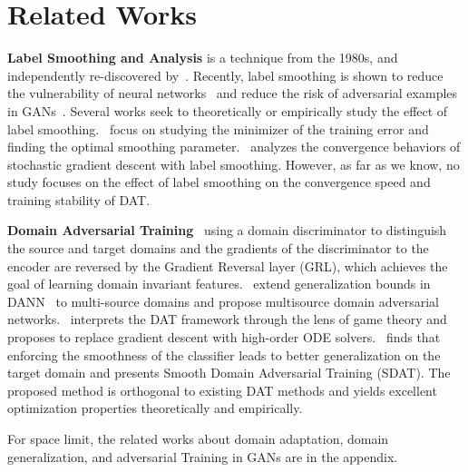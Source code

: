 \documentclass{article} \usepackage{iclr2023_conference,times}
\begin{document}
\section{Related Works}
\vspace{-0.2cm}





\noindent\textbf{Label Smoothing and Analysis} is a technique from the 1980s, and independently re-discovered by~\citep{szegedy2016rethinking}. Recently, label smoothing is shown to reduce the vulnerability of neural networks~\citep{warde201611} and reduce the risk of adversarial examples in GANs~\citep{salimans2016improved}. Several works seek to theoretically or empirically study the effect of label smoothing.~\citep{chen2020investigation} focus on studying the minimizer of the training error and finding the optimal smoothing parameter.~\citep{xu2020towards} analyzes the convergence behaviors of stochastic gradient descent with label smoothing. However, as far as we know, no study focuses on the effect of label smoothing on the convergence speed and training stability of DAT.

\noindent\textbf{Domain Adversarial Training}~\citep{ganin2016domain} using a domain discriminator to distinguish the source and target domains and the gradients of the discriminator to the encoder are reversed by the Gradient Reversal layer (GRL), which achieves the goal of learning domain invariant features.~\citep{schoenauer2019multi,zhao2018adversarial} extend generalization bounds in DANN~\citep{ganin2016domain} to multi-source domains and propose multisource domain adversarial networks.~\citep{acuna2022domain} interprets the DAT framework through the lens of game theory and proposes to replace gradient descent with high-order ODE solvers.~\citep{rangwani2022closer} finds that enforcing the smoothness of the classifier leads to better generalization on the target domain and presents Smooth Domain Adversarial Training (SDAT). The proposed method is orthogonal to existing DAT methods and yields excellent optimization properties theoretically and empirically.

For space limit, the related works about domain adaptation, domain generalization, and adversarial Training in GANs are in the appendix.


\vspace{-0.2cm}
\end{document}
